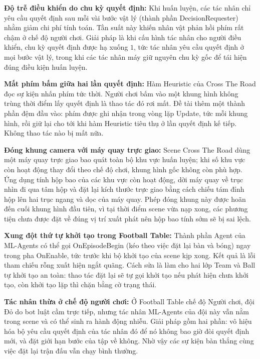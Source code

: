 \indent \textbf{Độ trễ điều khiển do chu kỳ quyết định:} Khi huấn luyện, các tác nhân
chỉ yêu cầu quyết định sau mỗi vài bước vật lý (thành phần
DecisionRequester) nhằm giảm chi phí tính toán. Tần suất này khiến nhân vật
phản hồi phím rất chậm ở chế độ người chơi. Giải pháp là khi cấu hình tác nhân cho
người điều khiển, chu kỳ quyết định được hạ xuống $1$, tức tác nhân yêu cầu quyết định ở mọi
bước vật lý, trong khi các tác nhân máy giữ nguyên chu kỳ gốc để tái
hiện đúng điều kiện huấn luyện.

\indent \textbf{Mất phím bấm giữa hai lần quyết định:} Hàm Heuristic của Cross
The Road đọc sự kiện nhấn phím tức thời. Người chơi bấm vào một khung hình không trùng
thời điểm lấy quyết định là thao tác đó rơi mất. Đề tài thêm một thành phần đệm đầu vào:
phím được ghi nhận trong vòng lặp Update, tức mỗi khung hình, rồi giữ lại cho tới
khi hàm Heuristic tiêu thụ ở lần quyết định kế tiếp. Không thao tác nào bị mất
nữa.

\indent \textbf{Đóng khung camera với máy quay trực giao:} Scene Cross The Road dùng
một máy quay trực giao bao quát toàn bộ khu vực huấn luyện; khi số khu vực còn hoạt
động thay đổi theo chế độ chơi, khung hình gốc không còn phù hợp. Ứng dụng tính
hộp bao của các khu vực còn hoạt động, dời máy quay về trục nhìn đi qua tâm hộp và
đặt lại kích thước trực giao bằng cách chiếu tám đỉnh hộp lên hai trục ngang và dọc của máy
quay. Phép đóng khung này được hoãn đến cuối khung hình đầu tiên, vì tại thời
điểm scene vừa nạp xong, các phương tiện chưa được đặt về đúng vị trí xuất phát nên
hộp bao tính sớm sẽ bị sai lệch.

\indent \textbf{Xung đột thứ tự khởi tạo trong Football Table:} Thành phần Agent
của ML-Agents có thể gọi OnEpisodeBegin (kéo theo việc đặt lại bàn và bóng) ngay
trong pha OnEnable, tức trước khi bộ khởi tạo của scene kịp xong. Kết quả là
lỗi tham chiếu rỗng xuất hiện ngắt quãng. Cách sửa là làm cho hai lớp Team và
Ball tự khởi tạo an toàn: thao tác đặt lại sẽ tự gọi khởi tạo nếu phát hiện chưa
khởi tạo, còn khởi tạo lặp thì chặn bằng cờ trạng thái.

\indent \textbf{Tác nhân thừa ở chế độ người chơi:} Ở Football Table chế độ Người
chơi, đội Đỏ do bot luật cầm trực tiếp, nhưng tác nhân ML-Agents của đội này vẫn nằm
trong scene và có thể sinh ra hành động nhiễu. Giải pháp gồm hai phần: vô hiệu hóa bộ yêu
cầu quyết định của tác nhân đó để nó không bao giờ đòi quyết định mới, và đặt giới hạn
bước của tập về không. Nhờ vậy các sự kiện bàn thắng cùng việc đặt lại trận đấu vẫn chạy
bình thường.

